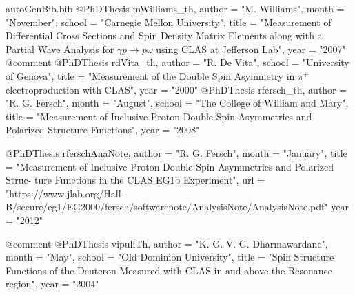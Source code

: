 \begin{filecontents*}{autoGenBib.bib}
@PhDThesis{ mWilliams_th,
	author = "M. Williams",
	month = "November",
	school = "Carnegie Mellon University",
	title = "{Measurement of Differential Cross Sections and Spin Density Matrix Elements along with a Partial Wave Analysis for $\gamma p \rightarrow p\omega$ using CLAS at Jefferson Lab}",
	year = "2007"
}
@comment %
@PhDThesis{ rdVita_th,
	author = "R. De Vita",
	school = "University of Genova",
	title = "{Measurement of the Double Spin Asymmetry in $\pi^+$ electroproduction with CLAS}",
	year = "2000"
}
@PhDThesis{ rfersch_th,
	author = "R. G. Fersch",
	month = "August",
	school = "The College of William and Mary",
	title = "{Measurement of Inclusive Proton Double-Spin Asymmetries and Polarized Structure Functions}",
	year = "2008"
}

@PhDThesis{ rferschAnaNote,
	author = "R. G. Fersch",
	month = "January",
	title = "{Measurement of Inclusive Proton Double-Spin Asymmetries and Polarized Struc-
          ture  Functions  in  the  CLAS  EG1b  Experiment}",
        url = "https://www.jlab.org/Hall-B/secure/eg1/EG2000/fersch/softwarenote/AnalysisNote/AnalysisNote.pdf"
	year = "2012"
}

@comment %
@PhDThesis{ vipuliTh,
	author = "K. G. V. G. Dharmawardane",
	month = "May",
	school = "Old Dominion University",
	title = "{Spin Structure Functions of the Deuteron Measured with CLAS in and above the Resonance region}",
	year = "2004"
}


\end{filecontents*}
